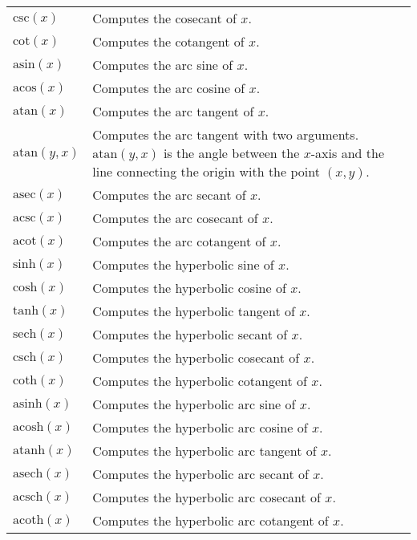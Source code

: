 \documentclass[10pt]{article}
\begin{document}
\begin{longtable}{p{}p{}}
        $ \mathrm{csc}(x) $                        & Computes the cosecant of $ x $. \\
        $ \mathrm{cot}(x) $                        & Computes the cotangent of $ x $. \\
        $ \mathrm{asin}(x) $                       & Computes the arc sine of $ x $. \\
        $ \mathrm{acos}(x) $                       & Computes the arc cosine of $ x $. \\
        $ \mathrm{atan}(x) $                       & Computes the arc tangent of $ x $. \\
        $ \mathrm{atan}(y, x) $                    & Computes the arc tangent with two arguments. $ \mathrm{atan}(y, x) $ is the angle between the $ x $-axis and the line connecting the origin with the point $ (x, y) $. \\
        $ \mathrm{asec}(x) $                       & Computes the arc secant of $ x $. \\
        $ \mathrm{acsc}(x) $                       & Computes the arc cosecant of $ x $. \\
        $ \mathrm{acot}(x) $                       & Computes the arc cotangent of $ x $. \\
        $ \mathrm{sinh}(x) $                       & Computes the hyperbolic sine of $ x $. \\
        $ \mathrm{cosh}(x) $                       & Computes the hyperbolic cosine of $ x $. \\
        $ \mathrm{tanh}(x) $                       & Computes the hyperbolic tangent of $ x $. \\
        $ \mathrm{sech}(x) $                       & Computes the hyperbolic secant of $ x $. \\
        $ \mathrm{csch}(x) $                       & Computes the hyperbolic cosecant of $ x $. \\
        $ \mathrm{coth}(x) $                       & Computes the hyperbolic cotangent of $ x $. \\
        $ \mathrm{asinh}(x) $                      & Computes the hyperbolic arc sine of $ x $. \\
        $ \mathrm{acosh}(x) $                      & Computes the hyperbolic arc cosine of $ x $. \\
        $ \mathrm{atanh}(x) $                      & Computes the hyperbolic arc tangent of $ x $. \\
        $ \mathrm{asech}(x) $                      & Computes the hyperbolic arc secant of $ x $. \\
        $ \mathrm{acsch}(x) $                      & Computes the hyperbolic arc cosecant of $ x $. \\
        $ \mathrm{acoth}(x) $                      & Computes the hyperbolic arc cotangent of $ x $. \\
    \end{longtable}
    
\end{document}
